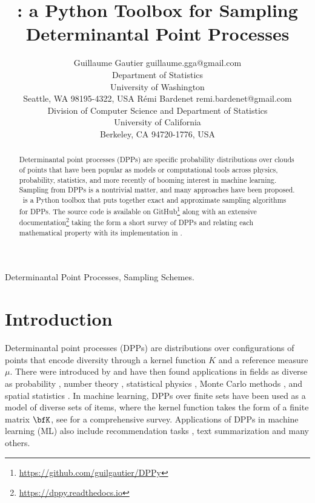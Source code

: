 \documentclass[twoside,11pt]{article}
\begin{document}
\title{\DPPy: a Python Toolbox for Sampling Determinantal Point Processes}

\author{\name Guillaume Gautier \email guillaume.gga@gmail.com \\
       \addr Department of Statistics\\
       University of Washington\\
       Seattle, WA 98195-4322, USA
       \AND
       \name R\'emi Bardenet \email remi.bardenet@gmail.com \\
       \addr Division of Computer Science and Department of Statistics\\
       University of California\\
       Berkeley, CA 94720-1776, USA}

\editor{}

\maketitle

\begin{abstract}%
  Determinantal point processes (DPPs) are specific probability distributions over clouds of points that have been popular as models or computational tools across physics, probability, statistics, and more recently of booming interest in machine learning. 
  Sampling from DPPs is a nontrivial matter, and many approaches have been proposed. \DPPy\ is a Python toolbox that puts together exact and approximate sampling algorithms for DPPs.
  The source code is available on GitHub\footnote{\url{https://github.com/guilgautier/DPPy}} along with an extensive documentation\footnote{\url{https://dppy.readthedocs.io}} taking the form a short survey of DPPs and relating each mathematical property with its implementation in \DPPy.
\end{abstract}

\begin{keywords}
  Determinantal Point Processes, Sampling Schemes.
\end{keywords}

\section{Introduction} %
\label{sec:introduction}

  Determinantal point processes (DPPs) are distributions over configurations of points that encode diversity through a kernel function $K$ and a reference measure $\mu$.
  There were introduced by \citet{Mac75} and have then found applications in fields as diverse as probability \citep{Sos00, Kon05, HKPV06}, number theory \citep{RuSa96}, statistical physics \citep{PaBe11}, Monte Carlo methods \citep{BaHa16}, and spatial statistics \citep{LaMoRu15}. 
  In machine learning, DPPs over finite sets have been used as a model of diverse sets of items, where the kernel function takes the form of a finite matrix $\bfK$, see \citet{KuTa12} for a comprehensive survey. 
  Applications of DPPs in machine learning (ML) also include recommendation tasks \citep{KaDeKo16, GaPaKo16}, text summarization \citep{DuBa16} and many others.\\
\end{document}
